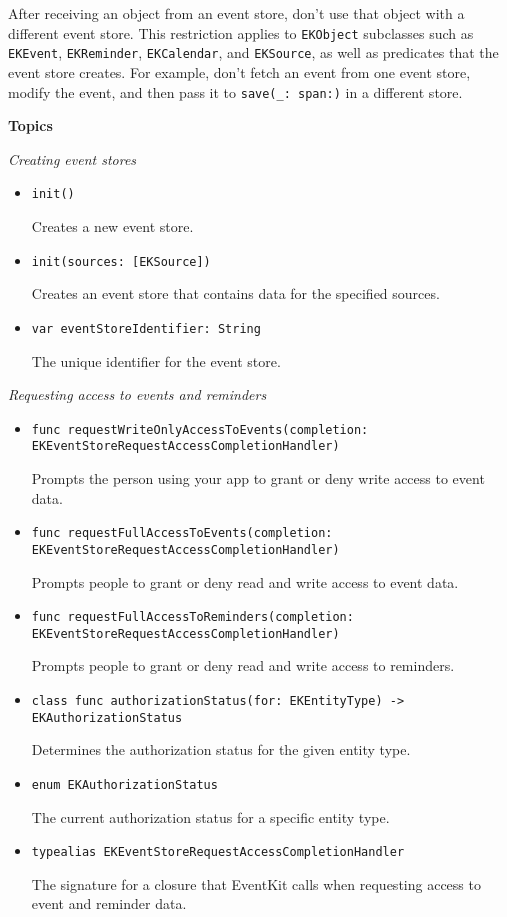 \documentclass{article}
\begin{document}
After receiving an object from an event store, don't use that object with a different event store. This restriction applies to \texttt{EKObject} subclasses such as \texttt{EKEvent}, \texttt{EKReminder}, \texttt{EKCalendar}, and \texttt{EKSource}, as well as predicates that the event store creates. For example, don't fetch an event from one event store, modify the event, and then pass it to \texttt{save(_: span:)} in a different store.

\textbf{Topics}

\textit{Creating event stores}
\begin{itemize}
    \item \texttt{init()}

    Creates a new event store.
    \item \texttt{init(sources: [EKSource])}

    Creates an event store that contains data for the specified sources.
    \item \texttt{var eventStoreIdentifier: String}

    The unique identifier for the event store.
\end{itemize}

\textit{Requesting access to events and reminders}
\begin{itemize}
    \item \texttt{func requestWriteOnlyAccessToEvents(completion: EKEventStoreRequestAccessCompletionHandler)}

    Prompts the person using your app to grant or deny write access to event data.
    \item \texttt{func requestFullAccessToEvents(completion: EKEventStoreRequestAccessCompletionHandler)}

    Prompts people to grant or deny read and write access to event data.
    \item \texttt{func requestFullAccessToReminders(completion: EKEventStoreRequestAccessCompletionHandler)}

    Prompts people to grant or deny read and write access to reminders.
    \item \texttt{class func authorizationStatus(for: EKEntityType) -> EKAuthorizationStatus}

    Determines the authorization status for the given entity type.
    \item \texttt{enum EKAuthorizationStatus}

    The current authorization status for a specific entity type.
    \item \texttt{typealias EKEventStoreRequestAccessCompletionHandler}

    The signature for a closure that EventKit calls when requesting access to event and reminder data.
\end{itemize}
\end{document}
